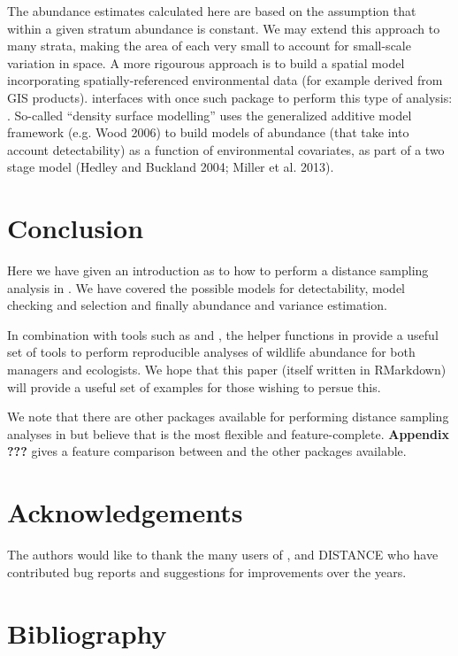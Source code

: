 \documentclass[article]{jss}
\begin{document}
The abundance estimates calculated here are based on the assumption that
within a given stratum abundance is constant. We may extend this
approach to many strata, making the area of each very small to account
for small-scale variation in space. A more rigourous approach is to
build a spatial model incorporating spatially-referenced environmental
data (for example derived from GIS products).  interfaces
with once such package to perform this type of analysis: .
So-called ``density surface modelling'' uses the generalized additive
model framework (e.g. Wood 2006) to build models of abundance (that take
into account detectability) as a function of environmental covariates,
as part of a two stage model (Hedley and Buckland 2004; Miller et al.
2013).

\section{Conclusion}\label{conclusion}

Here we have given an introduction as to how to perform a distance
sampling analysis in . We have covered the possible models
for detectability, model checking and selection and finally abundance
and variance estimation.

In combination with tools such as  and , the
helper functions in  provide a useful set of tools to
perform reproducible analyses of wildlife abundance for both managers
and ecologists. We hope that this paper (itself written in RMarkdown)
will provide a useful set of examples for those wishing to persue this.

We note that there are other packages available for performing distance
sampling analyses in  but believe that  is the
most flexible and feature-complete. \textbf{Appendix ???} gives a
feature comparison between  and the other packages
available.

\section{Acknowledgements}\label{acknowledgements}

The authors would like to thank the many users of ,
 and DISTANCE who have contributed bug reports and suggestions
for improvements over the years.

\section*{Bibliography}\label{bibliography}
\end{document}
